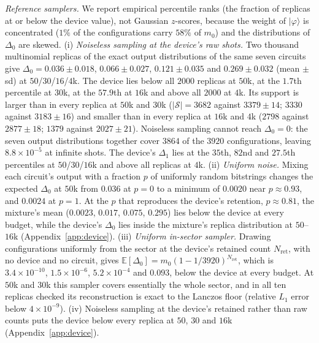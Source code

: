\documentclass[submission, PhysCore]{SciPost}
\begin{document}
\emph{Reference samplers.} We report empirical percentile ranks (the fraction of replicas at or below the device value), not Gaussian $z$-scores, because the weight of $|\varphi\rangle$ is concentrated ($1\%$ of the configurations carry $58\%$ of $m_0$) and the distributions of $\Delta_0$ are skewed. (i) \emph{Noiseless sampling at the device's raw shots.} Two thousand multinomial replicas of the exact output distributions of the same seven circuits give $\Delta_0={0.036\pm0.018}$, ${0.066\pm0.027}$, ${0.121\pm0.035}$ and ${0.269\pm0.032}$ (mean $\pm$ sd) at $50$/$30$/$16$/$4$k. The device lies below all $2000$ replicas at $50$k, at the $1.7$th percentile at $30$k, at the $57.9$th at $16$k and above all $2000$ at $4$k. Its support is larger than in every replica at $50$k and $30$k ($|\mathcal S|=3682$ against ${3379\pm14}$; $3330$ against ${3183\pm16}$) and smaller than in every replica at $16$k and $4$k ($2798$ against ${2877\pm18}$; $1379$ against ${2027\pm21}$). Noiseless sampling cannot reach $\Delta_0=0$: the seven output distributions together cover $3864$ of the $3920$ configurations, leaving $8.8\times10^{-5}$ at infinite shots. The device's $\Delta_1$ lies at the $35$th, $82$nd and $27.5$th percentiles at $50$/$30$/$16$k and above all replicas at $4$k. (ii) \emph{Uniform noise.} Mixing each circuit's output with a fraction $p$ of uniformly random bitstrings changes the expected $\Delta_0$ at $50$k from $0.036$ at $p=0$ to a minimum of $0.0020$ near $p\approx0.93$, and $0.0024$ at $p=1$. At the $p$ that reproduces the device's retention, $p\approx0.81$, the mixture's mean ($0.0023$, $0.017$, $0.075$, $0.295$) lies below the device at every budget, while the device's $\Delta_0$ lies inside the mixture's replica distribution at $50$--$16$k (Appendix~\ref{app:device}). (iii) \emph{Uniform in-sector sampler.} Drawing configurations uniformly from the sector at the device's retained count $N_{\mathrm{ret}}$, with no device and no circuit, gives $\mathbb{E}[\Delta_0]=m_0(1-1/3920)^{N_{\mathrm{ret}}}$, which is $3.4\times10^{-10}$, $1.5\times10^{-6}$, $5.2\times10^{-4}$ and $0.093$, below the device at every budget. At $50$k and $30$k this sampler covers essentially the whole sector, and in all ten replicas checked its reconstruction is exact to the Lanczos floor (relative $L_1$ error below $4\times10^{-9}$). (iv) Noiseless sampling at the device's retained rather than raw counts puts the device below every replica at $50$, $30$ and $16$k (Appendix~\ref{app:device}).
\end{document}
